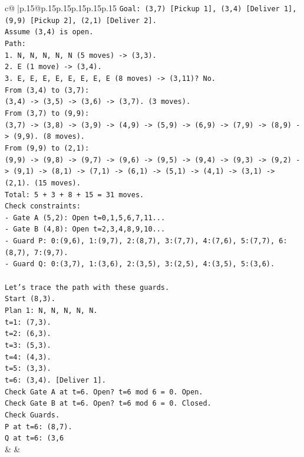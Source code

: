 \documentclass{article}
\begin{document}
{\begin{supertabular}{c@{$\;$}|p{.15\linewidth}@{}p{.15\linewidth}p{.15\linewidth}p{.15\linewidth}p{.15\linewidth}p{.15\linewidth}}
{{{\texttt{Goal: (3,7) {[}Pickup 1{]}, (3,4) {[}Deliver 1{]}, (9,9) {[}Pickup 2{]}, (2,1) {[}Deliver 2{]}.} \\
\texttt{Assume (3,4) is open.} \\
\texttt{Path:} \\
\texttt{1. N, N, N, N, N (5 moves) {-}> (3,3).} \\
\texttt{2. E (1 move) {-}> (3,4).} \\
\texttt{3. E, E, E, E, E, E, E, E (8 moves) {-}> (3,11)? No.} \\
\texttt{From (3,4) to (3,7):} \\
\texttt{(3,4) {-}> (3,5) {-}> (3,6) {-}> (3,7). (3 moves).} \\
\texttt{From (3,7) to (9,9):} \\
\texttt{(3,7) {-}> (3,8) {-}> (3,9) {-}> (4,9) {-}> (5,9) {-}> (6,9) {-}> (7,9) {-}> (8,9) {-}> (9,9). (8 moves).} \\
\texttt{From (9,9) to (2,1):} \\
\texttt{(9,9) {-}> (9,8) {-}> (9,7) {-}> (9,6) {-}> (9,5) {-}> (9,4) {-}> (9,3) {-}> (9,2) {-}> (9,1) {-}> (8,1) {-}> (7,1) {-}> (6,1) {-}> (5,1) {-}> (4,1) {-}> (3,1) {-}> (2,1). (15 moves).} \\
\texttt{Total: 5 + 3 + 8 + 15 = 31 moves.} \\
\texttt{Check constraints:} \\
\texttt{{-} Gate A (5,2): Open t=0,1,5,6,7,11...} \\
\texttt{{-} Gate B (4,8): Open t=2,3,4,8,9,10...} \\
\texttt{{-} Guard P: 0:(9,6), 1:(9,7), 2:(8,7), 3:(7,7), 4:(7,6), 5:(7,7), 6:(8,7), 7:(9,7).} \\
\texttt{{-} Guard Q: 0:(3,7), 1:(3,6), 2:(3,5), 3:(2,5), 4:(3,5), 5:(3,6).} \\
\\ 
\texttt{Let's trace the path with these guards.} \\
\texttt{Start (8,3).} \\
\texttt{Plan 1: N, N, N, N, N.} \\
\texttt{t=1: (7,3).} \\
\texttt{t=2: (6,3).} \\
\texttt{t=3: (5,3).} \\
\texttt{t=4: (4,3).} \\
\texttt{t=5: (3,3).} \\
\texttt{t=6: (3,4). {[}Deliver 1{]}.} \\
\texttt{Check Gate A at t=6. Open? t=6 mod 6 = 0. Open.} \\
\texttt{Check Gate B at t=6. Open? t=6 mod 6 = 0. Closed.} \\
\texttt{Check Guards.} \\
\texttt{P at t=6: (8,7).} \\
\texttt{Q at t=6: (3,6} \\
            }
        }
    }
    & & \\ \\


\end{supertabular}}
\end{document}
